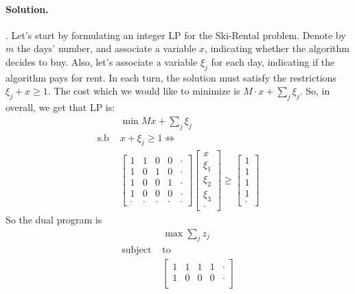 \documentclass{article}
\begin{document}
\begin{multicols*}{2}
  \paragraph{Solution.}. Let's start by formulating an integer LP for the Ski-Rental problem. Denote by $m$ the days' number, and associate a variable $x$, indicating whether the algorithm decides to buy. Also, let's associate a variable $\xi_{j}$ for each day, indicating if the algorithm pays for rent. In each turn, the solution must satisfy the restrictions $ \xi_{j} + x  \ge 1$. The cost which we would like to minimize is $ M\cdot x + \sum_{j}{\xi_{j}}$. So, in overall, we get that LP is:    
  \begin{equation*}
    \begin{split}
      & \min{ Mx + \sum_{j}{\xi_{j}}} \\
      \text{s.b } & x + \xi_{j} \ge 1 \Leftrightarrow \\ 
      & \begin{bmatrix}
	1 & 1 & 0 & 0 & \cdot\\
	1 & 0 & 1 & 0 & \cdot\\
	1 & 0 & 0 & 1 & \cdot\\
	1 & 0 & 0 & 0 & \cdot\\
	\cdot & \cdot & \cdot & \cdot & \cdot
      \end{bmatrix} 
      \begin{bmatrix}
	x \\
	\xi_{1} \\ 
	\xi_{2} \\
	\xi_{3} \\
	\cdot 
      \end{bmatrix} \ge
      \begin{bmatrix}
	1 \\
	1 \\ 
	1 \\
	1 \\
	\cdot 
      \end{bmatrix}
    \end{split}
  \end{equation*}
  So the dual program is 
  \begin{equation*}
    \begin{split}
      & \max{ \sum_{j}{z_{j}}} \\
      \text{subject } &  \text{to}  \\ 
      & \begin{bmatrix}
	1 & 1 & 1 & 1 & \cdot \\
	1 & 0 & 0 & 0 & \cdot \\

\end{bmatrix}
\end{split}
\end{equation*}
\end{multicols*}
\end{document}
